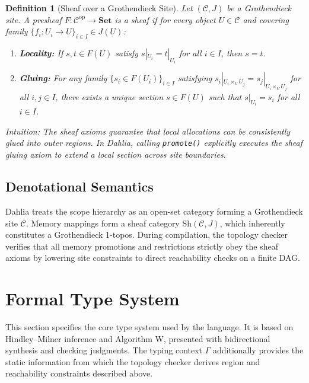 \documentclass[11pt]{article}
\newtheorem{definition}{Definition}[section]
\begin{document}
\begin{definition}[Sheaf over a Grothendieck Site]
    Let $(\mathcal{C}, J)$ be a Grothendieck site. A presheaf $F : \mathcal{C}^{\text{op}} \to \mathbf{Set}$ is a \emph{sheaf} if for every object $U \in \mathcal{C}$ and covering family $\{f_i : U_i \to U\}_{i \in I} \in J(U)$:
    \begin{enumerate}
        \item \textbf{Locality:} If $s, t \in F(U)$ satisfy $s|_{U_i} = t|_{U_i}$ for all $i \in I$, then $s = t$.
        \item \textbf{Gluing:} For any family $\{s_i \in F(U_i)\}_{i \in I}$ satisfying $s_i|_{U_i \times_U U_j} = s_j|_{U_i \times_U U_j}$ for all $i, j \in I$, there exists a unique section $s \in F(U)$ such that $s|_{U_i} = s_i$ for all $i \in I$.
    \end{enumerate}

    \vspace{0.5em}
    \noindent\textit{Intuition:} The sheaf axioms guarantee that local allocations can be consistently glued into outer regions. In Dahlia, calling \texttt{promote()} explicitly executes the sheaf gluing axiom to extend a local section across site boundaries.
\end{definition}

\subsection{Denotational Semantics}
Dahlia treats the scope hierarchy as an open-set category forming a Grothendieck site $\mathcal{C}$. Memory mappings form a sheaf category $\text{Sh}(\mathcal{C}, J)$, which inherently constitutes a Grothendieck 1-topos. During compilation, the topology checker verifies that all memory promotions and restrictions strictly obey the sheaf axioms by lowering site constraints to direct reachability checks on a finite DAG.

\pagebreak

\section{Formal Type System}

This section specifies the core type system used by the language. It is based on Hindley--Milner inference and Algorithm W, presented with bidirectional synthesis and checking judgments. The typing context $\Gamma$ additionally provides the static information from which the topology checker derives region and reachability constraints described above.
\end{document}
